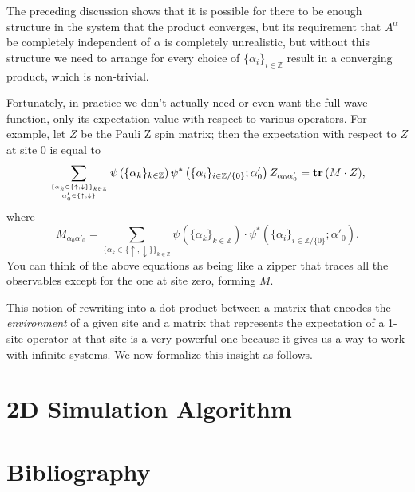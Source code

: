 \documentclass{report}
\newcommand{\paren}[1]{\left(#1\right)}
\newcommand{\tr}{\text{\textbf{tr}}\,}
\newcommand{\Z}{\mathbb{Z}}
\begin{document}
The preceding discussion shows that it is possible for there to be enough structure in the system that the product converges, but its requirement that $A^\alpha$ be completely independent of $\alpha$ is completely unrealistic, but without this structure we need to arrange for every choice of $\{\alpha_i\}_{i\in\Z}$ result in a converging product, which is non-trivial.

Fortunately, in practice we don't actually need or even want the full wave function, only its expectation value with respect to various operators.  For example, let $Z$ be the Pauli Z spin matrix;  then the expectation with respect to $Z$ at site 0 is equal to
$$\sum_{\{\alpha_k\in\{\uparrow,\downarrow\}\}_{k\in\Z}\atop\alpha'_0\in\{\uparrow,\downarrow\}}\psi\paren{\{\alpha_k\}_{k\in\Z}}\psi^*\paren{\{\alpha_i\}_{i\in\Z/\{0\}};\alpha'_0} Z_{\alpha_0\alpha'_0}=\tr(M\cdot Z),$$ where $$M_{\alpha_0\alpha'_0}=\sum_{\{\alpha_k\in\{\uparrow,\downarrow\}\}_{k\in\Z}}\psi\paren{\{\alpha_k\}_{k\in\Z}}\cdot\psi^*\paren{\{\alpha_i\}_{i\in\Z/\{0\}};\alpha'_0}.$$
You can think of the above equations as being like a zipper that traces all the observables except for the one at site zero, forming $M$.

This notion of rewriting into a dot product between a matrix that encodes the \emph{environment} of a given site and a matrix that represents the expectation of a 1-site operator at that site is a very powerful one because it gives us a way to work with infinite systems.  We now formalize this insight as follows.

\part{2D Simulation Algorithm}
\label{2dsim}

\part*{Bibliography}



\end{document}
